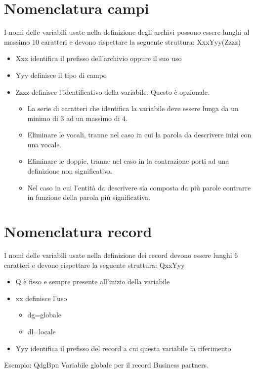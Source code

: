 \documentclass[target=bach,aauheader=,style=]{thud}
\begin{document}
\section{Nomenclatura campi}

I nomi delle variabili usate nella definizione degli archivi possono essere lunghi al massimo 10 caratteri e
devono rispettare la seguente struttura:
XxxYyy(Zzzz)

\begin{itemize}
    \item Xxx identifica il prefisso dell'archivio oppure il suo uso

    \item Yyy definisce il tipo di campo

    \item Zzzz definisce l'identificativo della variabile. Questo è opzionale.
    \begin{itemize}
        \item La serie di caratteri che identifica la variabile deve essere lunga da un minimo di 3 ad un massimo di 4.
        \item Eliminare le vocali, tranne nel caso in cui la parola da descrivere inizi con una vocale.
        \item Eliminare le doppie, tranne nel caso in la contrazione porti ad una definizione non significativa.
        \item Nel caso in cui l’entità da descrivere sia composta da più parole contrarre in funzione della parola più
        significativa.
    \end{itemize}
\end{itemize}


\section{Nomenclatura record}
I nomi delle variabili usate nella definizione dei record devono essere lunghi 6 caratteri e devono rispettare la
seguente struttura:
QxxYyy
\begin{itemize}
    \item Q è fisso e sempre presente all'inizio della variabile

    \item xx definisce l'uso
    \begin{itemize}
        \item dg=globale
        \item dl=locale
    \end{itemize}
    \item Yyy identifica il prefisso del record a cui questa variabile fa riferimento
\end{itemize}
Esempio: QdgBpn Variabile globale per il record Business partners.
\end{document}
